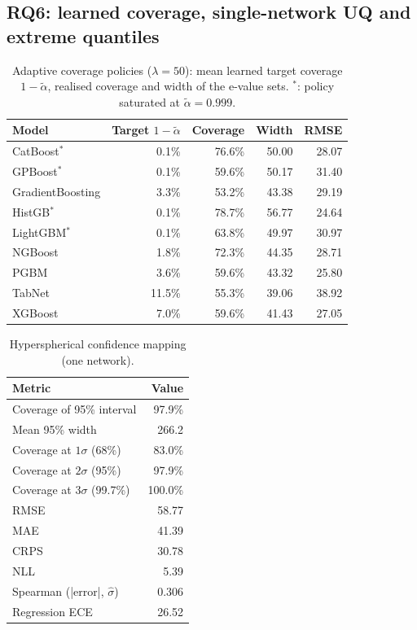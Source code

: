 \documentclass[11pt]{article}
\begin{document}
\subsection{RQ6: learned coverage, single-network UQ and extreme quantiles}
\begin{table}[t]\centering\small
\caption{Adaptive coverage policies ($\lambda=50$): mean learned target coverage $1-\tilde\alpha$, realised coverage and width of the e-value sets. $^\ast$: policy saturated at $\tilde\alpha=0.999$.}\label{tab:acp}
\begin{tabular}{lrrrr}\toprule Model & Target $1-\tilde\alpha$ & Coverage & Width & RMSE\\\midrule
CatBoost$^\ast$ & 0.1\% & 76.6\% & 50.00 & 28.07\\
GPBoost$^\ast$ & 0.1\% & 59.6\% & 50.17 & 31.40\\
GradientBoosting & 3.3\% & 53.2\% & 43.38 & 29.19\\
HistGB$^\ast$ & 0.1\% & 78.7\% & 56.77 & 24.64\\
LightGBM$^\ast$ & 0.1\% & 63.8\% & 49.97 & 30.97\\
NGBoost & 1.8\% & 72.3\% & 44.35 & 28.71\\
PGBM & 3.6\% & 59.6\% & 43.32 & 25.80\\
TabNet & 11.5\% & 55.3\% & 39.06 & 38.92\\
XGBoost & 7.0\% & 59.6\% & 41.43 & 27.05\\
\bottomrule\end{tabular}\end{table}
\begin{table}[t]\centering\small
\caption{Hyperspherical confidence mapping (one network).}\label{tab:hcm}
\begin{tabular}{lr}\toprule Metric & Value\\\midrule
Coverage of 95\% interval & 97.9\%\\
Mean 95\% width & 266.2\\
Coverage at $1\sigma$ (68\%) & 83.0\%\\
Coverage at $2\sigma$ (95\%) & 97.9\%\\
Coverage at $3\sigma$ (99.7\%) & 100.0\%\\
RMSE & 58.77\\
MAE & 41.39\\
CRPS & 30.78\\
NLL & 5.39\\
Spearman (|error|, $\hat\sigma$) & 0.306\\
Regression ECE & 26.52\\
\bottomrule\end{tabular}\end{table}
\end{document}

